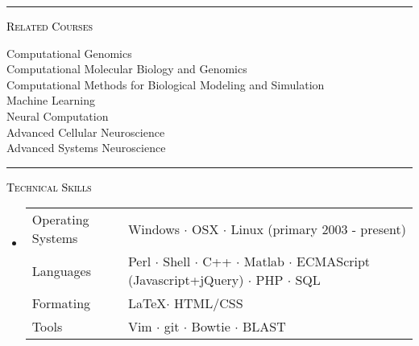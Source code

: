 \documentclass[letterpaper]{article}
\def\firstWidth{.10\textwidth}
\def\secondWidth{.90\textwidth}
\begin{document}
\vfill \begin{center}  \large \hrule \end{center}  \vfill

\begin{minipage}{\firstWidth}
\large \textcolor{Black}{\textsc{Related Courses}}
\end{minipage}
\begin{minipage}{\secondWidth}
\begin{itemize}  %
\begin{multicols}{2}
\item
Computational Genomics\\
Computational Molecular Biology and Genomics \\
Computational Methods for Biological Modeling and Simulation \\
Machine Learning \\
Neural Computation\\
Advanced Cellular Neuroscience \\
Advanced Systems Neuroscience \\
\end{multicols}
\end{itemize}
\end{minipage}

\vfill \begin{center}  \large \hrule \end{center}  \vfill 

\begin{minipage}{\firstWidth}
\large \textcolor{Black}{\textsc{Technical Skills}}
\end{minipage}
\begin{minipage}{\secondWidth}
\begin{itemize}
    \item 
    \begin{tabular}{ll}
    Operating Systems & Windows $\cdot$ OSX $\cdot$ Linux (primary 2003 - present) \\
    Languages &  Perl $\cdot$ Shell $\cdot$ C++ $\cdot$ Matlab $\cdot$ ECMAScript (Javascript+jQuery) $\cdot$ PHP $\cdot$ SQL \\
    Formating & \LaTeX  $\cdot$ HTML/CSS \\
    Tools&  Vim $\cdot$ git $\cdot$ Bowtie $\cdot$ BLAST
    \end{tabular}
\end{itemize}
\end{minipage}
\end{document}
